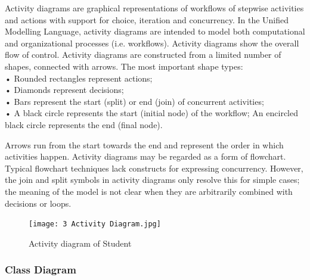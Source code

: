 \documentclass[12pt]{article}
\begin{document}
\begin{enumerate}
Activity diagrams are graphical representations of workflows of stepwise
activities and actions with support for choice, iteration and concurrency. In the
Unified Modelling Language, activity diagrams are intended to model both
computational and organizational processes (i.e. workflows). Activity diagrams
show the overall flow of control. Activity diagrams are constructed from a limited
number of shapes, connected with arrows. The most important shape types:
\\

• Rounded rectangles represent actions;\\

• Diamonds represent decisions;\\

• Bars represent the start (split) or end (join) of concurrent activities;\\

• A black circle represents the start (initial node) of the workflow; An encircled
black circle represents the end (final node).\\

\par Arrows run from the start towards the end and represent the order in
which activities happen. Activity diagrams may be regarded as a form of
flowchart. Typical flowchart techniques lack constructs for expressing concurrency.
However, the join and split symbols in activity diagrams only resolve this
for simple cases; the meaning of the model is not clear when they are arbitrarily
combined with decisions or loops.
\\ 

\vspace*{10px}
\begin{figure}[h!]
\begin{center}
\texttt{[image: 3 Activity Diagram.jpg]}
\caption{Activity diagram of Student}
\end{center}
\end{figure}


\newpage

\subsubsection{Class Diagram}


\end{enumerate}
\end{document}
